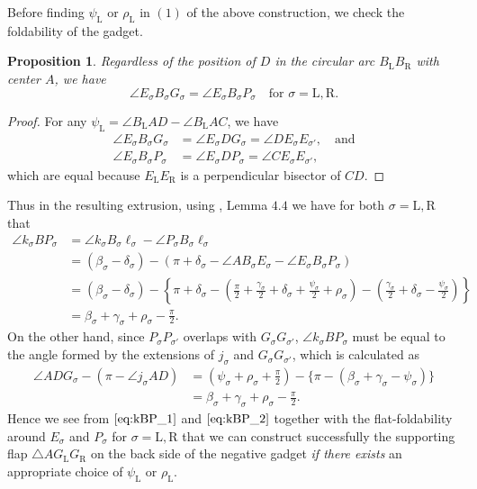 \documentclass[11pt]{amsart}
\newtheorem{proposition}[theorem]{Proposition}
\numberwithin{equation}{section}
\numberwithin{theorem}{section}
\newcommand{\Lt}{\ensuremath{\mathrm{L}}}
\newcommand{\Rt}{\ensuremath{\mathrm{R}}}
\begin{document}
Before finding $\psi_\Lt$ or $\rho_\Lt$ in $(1)$ of the above construction, we check the foldability of the gadget.
\begin{proposition}\label{prop:EBG=EBP}
Regardless of the position of $D$ in the circular arc $B_\Lt B_\Rt$ with center $A$,
we have
\begin{equation*}
\angle E_\sigma B_\sigma G_\sigma =\angle E_\sigma B_\sigma P_\sigma\quad\text{for }\sigma =\Lt ,\Rt .
\end{equation*}
\end{proposition}
\begin{proof}
For any $\psi_\Lt =\angle B_\Lt AD -\angle B_\Lt AC$, we have
\begin{align*}
\angle E_\sigma B_\sigma G_\sigma&=\angle E_\sigma DG_\sigma =\angle DE_\sigma E_{\sigma'},\quad\text{and}\\
\angle E_\sigma B_\sigma P_\sigma&=\angle E_\sigma DP_\sigma =\angle CE_\sigma E_{\sigma'},
\end{align*}
which are equal because $E_\Lt E_\Rt$ is a perpendicular bisector of $CD$.
\end{proof}
Thus in the resulting extrusion, using \cite{Doi20}, Lemma $4.4$ we have for both $\sigma =\Lt ,\Rt$ that
\begin{equation}\label{eq:kBP_1}
\begin{aligned}
\angle k_\sigma BP_\sigma&=\angle k_\sigma B_\sigma \ell_\sigma -\angle P_\sigma B_\sigma \ell_\sigma\\
&=(\beta_\sigma -\delta_\sigma )-(\pi +\delta_\sigma -\angle AB_\sigma E_\sigma -\angle E_\sigma B_\sigma P_\sigma )\\
&=(\beta_\sigma -\delta_\sigma )-\left\{\pi +\delta_\sigma -\left(\frac{\pi}{2}+\frac{\gamma_\sigma}{2}+\delta_\sigma+\frac{\psi_\sigma}{2}+\rho_\sigma\right)
-\left(\frac{\gamma_\sigma}{2}+\delta_\sigma-\frac{\psi_\sigma}{2}\right)\right\}\\
&=\beta_\sigma +\gamma_\sigma +\rho_\sigma -\frac{\pi}{2}.
\end{aligned}
\end{equation}
On the other hand, since $P_\sigma P_{\sigma'}$ overlaps with $G_\sigma G_{\sigma'}$,
$\angle k_\sigma BP_\sigma$ must be equal to the angle formed by the extensions of $j_\sigma$ and $G_\sigma G_{\sigma'}$, which is calculated as
\begin{equation}\label{eq:kBP_2}
\begin{aligned}
\angle ADG_\sigma -(\pi -\angle j_\sigma AD)
&=\left(\psi_\sigma +\rho_\sigma +\frac{\pi}{2}\right) -\{\pi -(\beta_\sigma +\gamma_\sigma -\psi_\sigma)\}\\
&=\beta_\sigma +\gamma_\sigma +\rho_\sigma -\frac{\pi}{2}.
\end{aligned}
\end{equation}
Hence we see from $\eqref{eq:kBP_1}$ and $\eqref{eq:kBP_2}$ together with the flat-foldability around $E_\sigma$ and $P_\sigma$ for $\sigma =\Lt ,\Rt$ that
we can construct successfully the supporting flap $\triangle AG_\Lt G_\Rt$ on the back side of the negative gadget
\emph{if there exists} an appropriate choice of $\psi_\Lt$ or $\rho_\Lt$.
\end{document}
